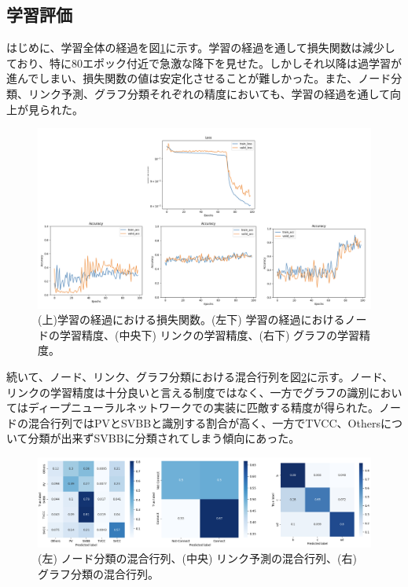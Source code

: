 \subsection{学習評価}
はじめに、学習全体の経過を図\ref{gnnoutput}に示す。学習の経過を通して損失関数は減少しており、特に80エポック付近で急激な降下を見せた。しかしそれ以降は過学習が進んでしまい、損失関数の値は安定化させることが難しかった。また、ノード分類、リンク予測、グラフ分類それぞれの精度においても、学習の経過を通して向上が見られた。\\
\begin{figure}[H]
	\begin{center}
 \includegraphics[keepaspectratio, scale=0.3]
 	{Figure/Flavortagging/gnnoutput.png}
 		\caption{(上)学習の経過における損失関数。(左下) 学習の経過におけるノードの学習精度、(中央下) リンクの学習精度、(右下) グラフの学習精度。}
 		\label{gnnoutput}
	\end{center}
\end{figure}
続いて、ノード、リンク、グラフ分類における混合行列を図\ref{gnncm}に示す。ノード、リンクの学習精度は十分良いと言える制度ではなく、一方でグラフの識別においてはディープニューラルネットワークでの実装に匹敵する精度が得られた。ノードの混合行列ではPVとSVBBと識別する割合が高く、一方でTVCC、Othersについて分類が出来ずSVBBに分類されてしまう傾向にあった。\\
\begin{figure}[H]
	\begin{center}
 \includegraphics[keepaspectratio, scale=0.3]
 	{Figure/Flavortagging/gnncm.png}
 		\caption{(左) ノード分類の混合行列、(中央) リンク予測の混合行列、(右) グラフ分類の混合行列。}
 		\label{gnncm}
	\end{center}
\end{figure}
